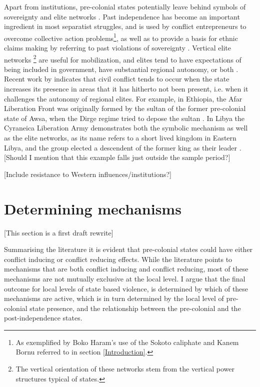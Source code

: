 \documentclass[12pt]{article}
\begin{document}
Apart from institutions, pre-colonial states potentially leave behind symbols of
sovereignty and elite networks \citep{Wishman}. Past independence has become an
important ingredient in most separatist struggles, and is used by conflict
entrepreneurs to overcome collective action problems\footnote{As exemplified by
Boko Haram's use of the Sokoto caliphate and Kanem Bornu referred to in section
\ref{Introduction}.}, as well as to provide a basis for ethnic claims making by
referring to past violations of sovereignty \citep{Ahram2019, Shelef2016}.
Vertical elite networks \footnote{The vertical orientation of these networks
stem from the vertical power structures typical of states.} are useful for
mobilization, and elites tend to have expectations of being included in
government, have substantial regional autonomy, or both \citep{Wishman}. Recent
work by \citet{Ying_2020} indicates that civil conflict tends to occur when the
state increases its presence in areas that it has hitherto not been present,
i.e. when it challenges the autonomy of regional elites. For example, in
Ethiopia, the Afar Liberation Front was originally formed by the sultan of the
former pre-colonial state of Awsa, when the Dirge regime tried to depose the
sultan \citep{Shehim1985, Hanfare2011}.  In Libya the Cyraneica Liberation Army
demonstrates both the symbolic mechanism as well as the elite networks, as its
name refers to a short lived kingdom in Eastern Libya, and the group elected a
descendent of the former king as their leader \citep{Ahram2019}. [Should I
mention that this example falls just outside the sample period?]

 [Include resistance to Western influences/institutions?]

\section{Determining mechanisms} \label{Determining mechanisms} 

[This section is a first draft rewrite]

Summarising the literature it is evident that pre-colonial states could have
either conflict inducing or conflict reducing effects. While the literature
points to mechanisms that are both conflict inducing and conflict reducing, most
of these mechanisms are not mutually exclusive at the local level. I argue that
the final outcome for local levels of state based violence, is determined by
which of these mechanisms are active, which is in turn determined by the local
level of pre-colonial state presence, and the relationship between the
pre-colonial and the post-independence states.
\end{document}
